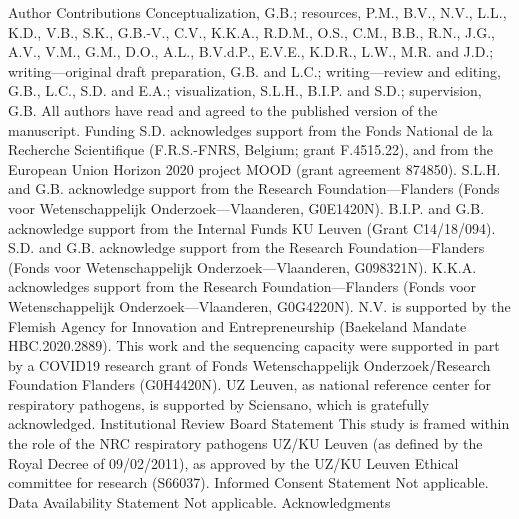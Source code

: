Author Contributions
Conceptualization, G.B.; resources, P.M., B.V., N.V., L.L., K.D., V.B., S.K., G.B.-V., C.V., K.K.A., R.D.M., O.S., C.M., B.B., R.N., J.G., A.V., V.M., G.M., D.O., A.L., B.V.d.P., E.V.E., K.D.R., L.W., M.R. and J.D.; writing—original draft preparation, G.B. and L.C.; writing—review and editing, G.B., L.C., S.D. and E.A.; visualization, S.L.H., B.I.P. and S.D.; supervision, G.B. All authors have read and agreed to the published version of the manuscript.
Funding
S.D. acknowledges support from the Fonds National de la Recherche Scientifique (F.R.S.-FNRS, Belgium; grant F.4515.22), and from the European Union Horizon 2020 project MOOD (grant agreement 874850). S.L.H. and G.B. acknowledge support from the Research Foundation—Flanders (Fonds voor Wetenschappelijk Onderzoek—Vlaanderen, G0E1420N). B.I.P. and G.B. acknowledge support from the Internal Funds KU Leuven (Grant C14/18/094). S.D. and G.B. acknowledge support from the Research Foundation—Flanders (Fonds voor Wetenschappelijk Onderzoek—Vlaanderen, G098321N). K.K.A. acknowledges support from the Research Foundation—Flanders (Fonds voor Wetenschappelijk Onderzoek—Vlaanderen, G0G4220N). N.V. is supported by the Flemish Agency for Innovation and Entrepreneurship (Baekeland Mandate HBC.2020.2889). This work and the sequencing capacity were supported in part by a COVID19 research grant of Fonds Wetenschappelijk Onderzoek/Research Foundation Flanders (G0H4420N). UZ Leuven, as national reference center for respiratory pathogens, is supported by Sciensano, which is gratefully acknowledged.
Institutional Review Board Statement
This study is framed within the role of the NRC respiratory pathogens UZ/KU Leuven (as defined by the Royal Decree of 09/02/2011), as approved by the UZ/KU Leuven Ethical committee for research (S66037).
Informed Consent Statement
Not applicable.
Data Availability Statement
Not applicable.
Acknowledgments
